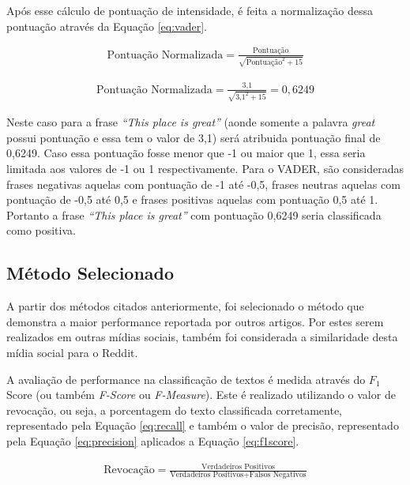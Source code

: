 Após esse cálculo de pontuação de intensidade, é feita a normalização dessa
pontuação através da Equação \ref{eq:vader}.

\begin{equation}
\begin{gathered}
\text{Pontuação Normalizada}
=
\frac{\text{Pontuação}}{\sqrt{\text{Pontuação}^2 + 15}}
\label{eq:vader}
\end{gathered}
\end{equation}


\begin{equation}
\begin{gathered}
\text{Pontuação Normalizada}
=
\frac{\text{3,1}}{\sqrt{\text{3,1}^2 + 15}} = 0,6249
\label{eq:vaderscore}
\end{gathered}
\end{equation}

Neste caso para a frase \textit{``This place is great''} (aonde somente a
palavra \textit{great} possui pontuação e essa tem o valor de 3,1) será
atribuida pontuação final de 0,6249.  Caso essa
pontuação fosse menor que -1 ou maior que 1, essa seria limitada aos valores de
-1 ou 1 respectivamente. Para o \ac{VADER}, são consideradas frases negativas aquelas
com pontuação de -1 até -0,5, frases neutras aquelas com pontuação de -0,5 até
0,5 e frases positivas aquelas com pontuação 0,5 até 1. Portanto a frase
\textit{``This place is great''} com pontuação 0,6249 seria classificada como
positiva.

\subsection{Método Selecionado}

A partir dos métodos citados anteriormente, foi selecionado o método que
demonstra a maior performance reportada por outros artigos. Por estes serem
realizados em outras mídias sociais, também foi considerada a similaridade desta
mídia social para o Reddit.

A avaliação de performance na classificação de textos é medida através do $F_1$
Score (ou também \textit{F-Score} ou \textit{F-Measure}). Este é realizado
utilizando o valor de revocação, ou seja, a porcentagem do texto
classificada corretamente, representado pela Equação \ref{eq:recall} e também
o valor de precisão, representado pela Equação \ref{eq:precision} aplicados a
Equação \ref{eq:f1score}.

\begin{equation}
\begin{gathered}
\text{Revocação}
=
\frac{\text{Verdadeiros Positivos}}{\text{Verdadeiros Positivos} +
\text{Falsos Negativos}}
\label{eq:recall}
\end{gathered}
\end{equation}

